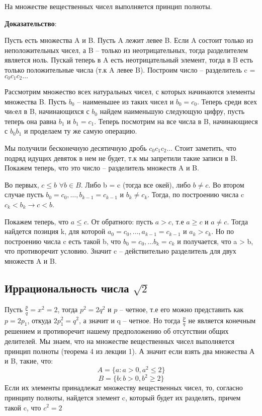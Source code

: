 \documentclass[a4paper,12pt]{article}
\begin{document}
На множестве вещественных чисел выполняется принцип полноты.

\textbf{Доказательство}:

Пусть есть множества A и B. Пусть A лежит левее B. Если A состоит только из неположительных чисел, а B -- только из неотрицательных, тогда разделителем является ноль. Пускай теперь в A есть неотрицательный элемент, тогда в B есть только положительные числа (т.к A левее B). Построим число -- разделитель c = $c_0c_1c_2\ldots$

Рассмотрим множество всех натуральных чисел, с которых начинаются элементы множества B. Пусть $b_0$ -- наименьшее из таких чисел и $b_0 = c_0$. Теперь среди всех чиcел в B, начинающихся с $b_0$ найдем наименьшую следующую цифру, пусть теперь она равна $b_1$ и $b_1 = c_1$. Теперь посмотрим на все числа в B, начинающиеся с $b_0b_1$ и проделаем ту же самую операцию. 

Мы получили бесконечную десятичную дробь $c_0c_1c_2\ldots$ Стоит заметить, что подряд идущих девяток в нем не будет, т.к мы запретили такие записи в B. Покажем теперь, что это число -- разделитель множеств A и B. 

Во первых, $c \leq b$ $\forall b \in B$. Либо b = c (тогда все окей), либо $b \neq c$. Во втором случае пусть $b_0 = c_0, \ldots, b_{k-1} = c_{k-1}$ и $b_k \neq c_k$. Тогда, по построению числа c $c_k < b_k \rightarrow c < b$.

Покажем теперь, что  $a \leq c$. От обратного: пусть $a > c$, т.е $a \geq c$ и $ a \neq c$. Тогда найдется позиция k, для которой $a_0 = c_0, \ldots, a_{k-1} = c_{k-1}$ и $a_k > c_k$. Но по построению числа c есть такой b, что $b_0 = c_0, \ldots b_k = c_k$ и получается, что a > b, что противоречит условию. Значит c -- действительно разделитель для двух множеств A и B.
\subsection*{Иррациональность числа $\sqrt{2}$}
Пусть $\frac{p}{q} = x^2 = 2$, тогда $p^2 = 2q^2$ и $p$ -- четное, т.е его можно представить как  $p = 2p_1$, откуда $2p^2_1 = q^2$, а значит и q -- четное. Но тогда $\frac{p}{q}$ не является конечным решением и противоречит нашему предположению об отсутствии общих делителей. Мы знаем, что на множестве вещественных чисел выполняется принцип полноты (теорема 4 из лекции 1). А значит если взять два множества А и B, такие, что:
\[
A = \{a : a > 0, a^2 \leq 2\}
\]
\[
B = \{ b: b > 0, b^2 \geq 2\}
\]
Если их элементы принадлежат множеству вещественных чисел, то, согласно принципу полноты, найдется элемент c, который будет их разделять, причем такой c, что $c^2 = 2$
\end{document}
